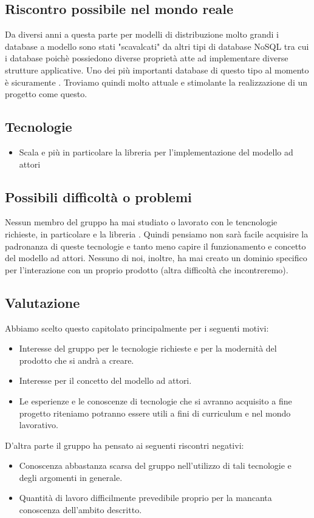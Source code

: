 \documentclass{scalatekids-article}
\begin{document}
\subsection{Riscontro possibile nel mondo reale}
Da diversi anni a questa parte per modelli di distribuzione molto grandi i
database a modello  sono stati "scavalcati" da altri tipi di
database NoSQL tra cui i database  poichè possiedono diverse
proprietà atte ad implementare diverse strutture applicative. Uno dei più
importanti database di questo tipo al momento è sicuramente .
Troviamo quindi molto attuale e stimolante la realizzazione di un progetto come
questo.

\subsection{Tecnologie}
\begin{itemize}
\item Scala e più in particolare la libreria  per l'implementazione del modello ad attori
\end{itemize}

\subsection{Possibili difficoltà o problemi}
Nessun membro del gruppo ha mai studiato o lavorato con le tencnologie
richieste, in particolare  e la libreria . Quindi pensiamo non sarà
facile acquisire la padronanza di queste tecnologie e tanto meno capire il
funzionamento e concetto del modello ad attori. Nessuno di noi, inoltre, ha mai
creato un dominio specifico per l'interazione con un proprio prodotto (altra
difficoltà che incontreremo).

\subsection{Valutazione}
Abbiamo scelto questo capitolato principalmente per i seguenti motivi:
\begin{itemize}
\item Interesse del gruppo per le tecnologie richieste e per la modernità del prodotto che si andrà a creare.
\item Interesse per il concetto del modello ad attori.
\item Le esperienze e le conoscenze di tecnologie che si avranno acquisito a fine progetto riteniamo potranno essere utili a fini di curriculum e nel mondo lavorativo.
\end{itemize}
D'altra parte il gruppo ha pensato ai seguenti riscontri negativi:
\begin{itemize}
\item Conoscenza abbastanza scarsa del gruppo nell'utilizzo di tali tecnologie e degli argomenti in generale.
\item Quantità di lavoro difficilmente prevedibile proprio per la mancanta conoscenza dell'ambito descritto.
\end{itemize}
\end{document}

